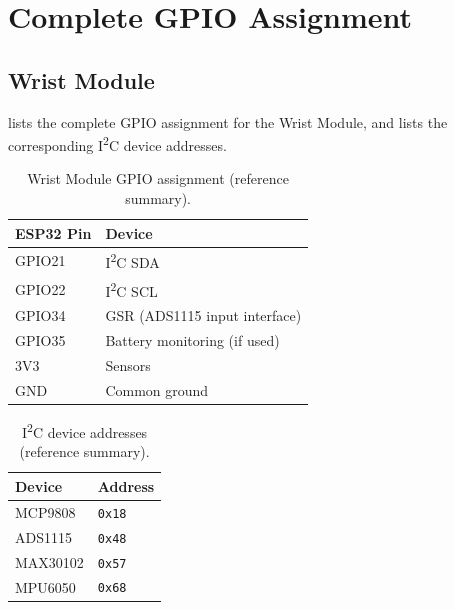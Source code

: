 \section{Complete GPIO Assignment}
\label{sec:complete-gpio}

\subsection{Wrist Module}
\label{sec:complete-gpio-wrist}

 lists the complete GPIO assignment for the Wrist Module, and  lists the corresponding I\textsuperscript{2}C device addresses.

\begin{table}[H]
\centering
\caption{Wrist Module GPIO assignment (reference summary).}
\label{tab:wrist-gpio-ref}
\small
\begin{tabularx}{\columnwidth}{@{}l Y@{}}
\toprule
\textbf{ESP32 Pin} & \textbf{Device} \\
\midrule
GPIO21 & I\textsuperscript{2}C SDA \\
GPIO22 & I\textsuperscript{2}C SCL \\
GPIO34 & GSR (ADS1115 input interface) \\
GPIO35 & Battery monitoring (if used) \\
3V3 & Sensors \\
GND & Common ground \\
\bottomrule
\end{tabularx}
\end{table}

\begin{table}[H]
\centering
\caption{I\textsuperscript{2}C device addresses (reference summary).}
\label{tab:i2c-addresses-ref}
\small
\begin{tabularx}{\columnwidth}{@{}Y l@{}}
\toprule
\textbf{Device} & \textbf{Address} \\
\midrule
MCP9808 & \texttt{0x18} \\
ADS1115 & \texttt{0x48} \\
MAX30102 & \texttt{0x57} \\
MPU6050 & \texttt{0x68} \\
\bottomrule
\end{tabularx}
\end{table}

